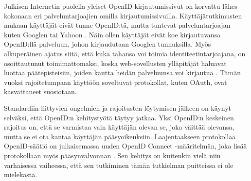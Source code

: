 Julkisen Internetin puolella yleiset OpenID-kir\-jau\-tu\-mis\-si\-vut on korvattu lähes kokonaan eri palveluntarjoajien omilla kirjautumissivuilla. Käyttäjätutkimusten mukaan käyttäjät eivät tunne OpenID:tä, mutta tuntevat palveluntarjoajan kuten Googlen tai Yahoon \cite{refuse_sso}. Näin ollen käyttäjät eivät koe kirjautuvansa OpenID:llä palveluun, johon kirjaudutaan Googlen tunnuksilla. Myös alkuperäinen ajatus siitä, että kuka tahansa voi toimia identiteetintarjoajana, on osoittautunut toimimattomaksi, koska web-sovellusten ylläpitäjät haluavat luottaa päätepisteisiin, joiden kautta heidän palveluunsa voi kirjautua \cite{refuse_sso}. Tämän vuoksi rajoitetumpaan käyttöön soveltuvat protokollat, kuten OAuth, ovat kasvattaneet suosiotaan.

Standardiin liittyvien ongelmien ja rajoitusten löytymisen jälkeen on käynyt selväksi, että \mbox{OpenID:n} kehitystyötä täytyy jatkaa. Yksi OpenID:n keskeinen rajoitus on, että se varmistaa vain käyttäjän olevan se, joka väittää olevansa, mutta se ei ota kantaa käyttäjän pääsyoikeuksiin. Laajentaakseen protokollaa OpenID-säätiö on julkaisemassa uuden OpenID Connect -määritelmän, joka lisää protokollaan myös pääsynvalvonnan \cite{distributed_web_security}. Sen kehitys on kuitenkin vielä niin varhaisessa vaiheessa, että sen tutkiminen tämän tutkielman puitteissa ei ole mielekästä.